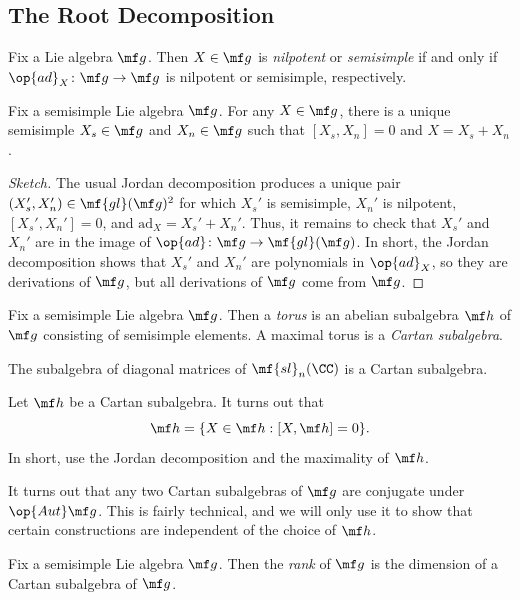 \documentclass{article}
\begin{document}
\subsection{The Root Decomposition} \label{subsec:root-decomp}
\begin{definition}
	Fix a Lie algebra $\mf g$. Then $X\in\mf g$ is \textit{nilpotent} or \textit{semisimple} if and only if $\op{ad}_X\colon\mf g\to\mf g$ is nilpotent or semisimple, respectively.
\end{definition}
\begin{proposition}
	Fix a semisimple Lie algebra $\mf g$. For any $X\in\mf g$, there is a unique semisimple $X_s\in\mf g$ and $X_n\in\mf g$ such that $[X_s,X_n]=0$ and $X=X_s+X_n$.
\end{proposition}
\begin{proof}[Sketch]
	The usual Jordan decomposition produces a unique pair $(X_s',X_n')\in\mf{gl}(\mf g)^2$ for which $X_s'$ is semisimple, $X_n'$ is nilpotent, $[X_s',X_n']=0$, and $\mathrm{ad}_X=X_s'+X_n'$. Thus, it remains to check that $X_s'$ and $X_n'$ are in the image of $\op{ad}\colon\mf g\to\mf{gl}(\mf g)$. In short, the Jordan decomposition shows that $X_s'$ and $X_n'$ are polynomials in $\op{ad}_X$, so they are derivations of $\mf g$, but all derivations of $\mf g$ come from $\mf g$.
\end{proof}
\begin{definition}[Cartan]
	Fix a semisimple Lie algebra $\mf g$. Then a \textit{torus} is an abelian subalgebra $\mf h$ of $\mf g$ consisting of semisimple elements. A maximal torus is a \textit{Cartan subalgebra}.
\end{definition}
\begin{example}
	The subalgebra of diagonal matrices of $\mf{sl}_n(\CC)$ is a Cartan subalgebra.
\end{example}
\begin{remark}
	Let $\mf h$ be a Cartan subalgebra. It turns out that
	\[\mf h=\{X\in\mf h:[X,\mf h]=0\}.\]
	In short, use the Jordan decomposition and the maximality of $\mf h$.
\end{remark}
\begin{remark}
	It turns out that any two Cartan subalgebras of $\mf g$ are conjugate under $\op{Aut}\mf g$. This is fairly technical, and we will only use it to show that certain constructions are independent of the choice of $\mf h$.
\end{remark}
\begin{definition}[rank]
	Fix a semisimple Lie algebra $\mf g$. Then the \textit{rank} of $\mf g$ is the dimension of a Cartan subalgebra of $\mf g$.
\end{definition}
\end{document}
